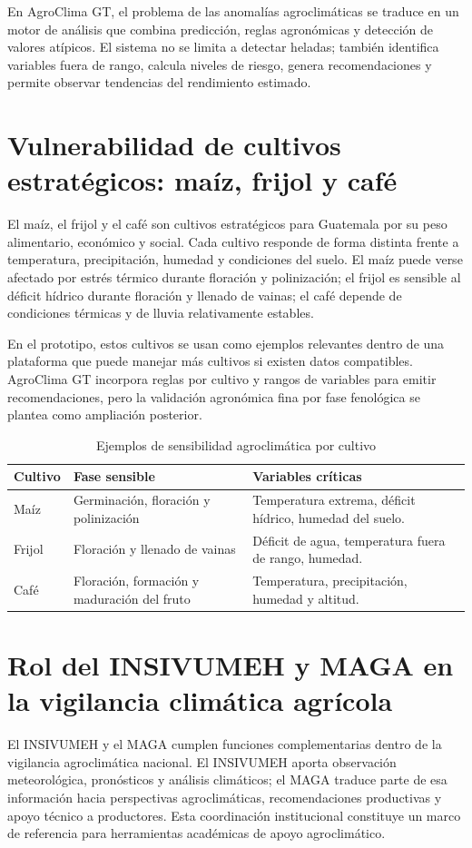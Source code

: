 \documentclass[12pt,letterpaper,oneside]{report}
\begin{document}
En AgroClima GT, el problema de las anomalías agroclimáticas se traduce en un motor de análisis que combina predicción, reglas agronómicas y detección de valores atípicos. El sistema no se limita a detectar heladas; también identifica variables fuera de rango, calcula niveles de riesgo, genera recomendaciones y permite observar tendencias del rendimiento estimado.

\section{Vulnerabilidad de cultivos estratégicos: maíz, frijol y café}
El maíz, el frijol y el café son cultivos estratégicos para Guatemala por su peso alimentario, económico y social. Cada cultivo responde de forma distinta frente a temperatura, precipitación, humedad y condiciones del suelo. El maíz puede verse afectado por estrés térmico durante floración y polinización; el frijol es sensible al déficit hídrico durante floración y llenado de vainas; el café depende de condiciones térmicas y de lluvia relativamente estables.

En el prototipo, estos cultivos se usan como ejemplos relevantes dentro de una plataforma que puede manejar más cultivos si existen datos compatibles. AgroClima GT incorpora reglas por cultivo y rangos de variables para emitir recomendaciones, pero la validación agronómica fina por fase fenológica se plantea como ampliación posterior.

\begin{table}[H]
\centering
\caption{Ejemplos de sensibilidad agroclimática por cultivo}
\begin{tabularx}{\textwidth}{p{2.5cm}p{4cm}X}
\toprule
\textbf{Cultivo} & \textbf{Fase sensible} & \textbf{Variables críticas} \\
\midrule
Maíz & Germinación, floración y polinización & Temperatura extrema, déficit hídrico, humedad del suelo. \\
Frijol & Floración y llenado de vainas & Déficit de agua, temperatura fuera de rango, humedad. \\
Café & Floración, formación y maduración del fruto & Temperatura, precipitación, humedad y altitud. \\
\bottomrule
\end{tabularx}
\end{table}

\section{Rol del INSIVUMEH y MAGA en la vigilancia climática agrícola}
El INSIVUMEH y el MAGA cumplen funciones complementarias dentro de la vigilancia agroclimática nacional. El INSIVUMEH aporta observación meteorológica, pronósticos y análisis climáticos; el MAGA traduce parte de esa información hacia perspectivas agroclimáticas, recomendaciones productivas y apoyo técnico a productores. Esta coordinación institucional constituye un marco de referencia para herramientas académicas de apoyo agroclimático.
\end{document}
